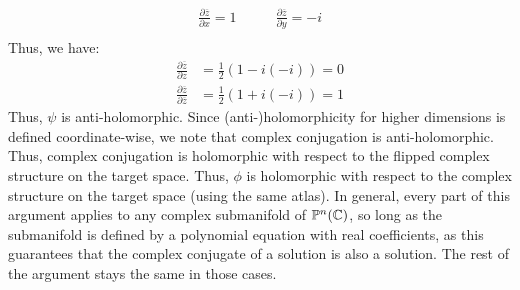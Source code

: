 \documentclass[12pt]{article}
\begin{document}
\begin{solu}
    \begin{align*}
        \frac{\partial \overline{z}}{\partial x} = 1 & \qquad \frac{\partial \overline{z}}{\partial y} = -i \\
    \end{align*}
    Thus, we have:
    \begin{align*}
        \frac{\partial \overline{z}}{\partial z} &= \frac{1}{2}(1-i(-i)) = 0 \\
        \frac{\partial \overline{z}}{\partial \overline{z}} &= \frac{1}{2}(1+i(-i)) = 1
    \end{align*}
    Thus, $\psi$ is anti-holomorphic. Since (anti-)holomorphicity for higher dimensions is defined coordinate-wise, we note that complex conjugation is anti-holomorphic. Thus, complex conjugation is holomorphic with respect to the flipped complex structure on the target space. Thus, $\phi$ is holomorphic with respect to the complex structure on the target space (using the same atlas). \bbni 
    In general, every part of this argument applies to any complex submanifold of $\mathbb{P}^n(\mathbb C)$, so long as the submanifold is defined by a polynomial equation with real coefficients, as this guarantees that the complex conjugate of a solution is also a solution. The rest of the argument stays the same in those cases.
\end{solu}
\end{document}
